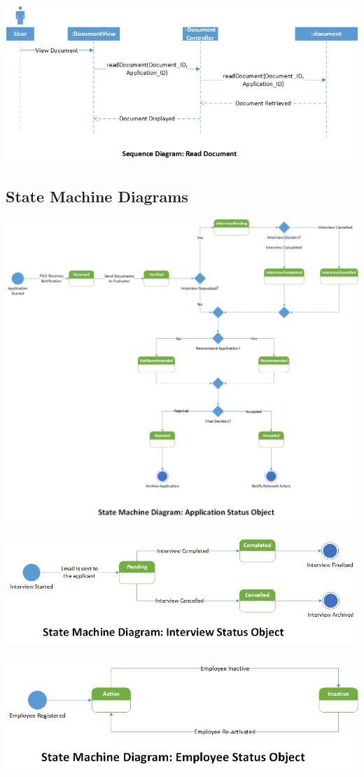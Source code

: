 \documentclass{article}
\begin{document}
\includegraphics[scale=0.7]{ReadDocumentSD.png} 
\subsection{State Machine Diagrams}
\includegraphics[scale=0.45]{ApplicationSMD.png} \\ \\
\includegraphics[scale=0.7]{InterviewSMD.png} \\ \\
\includegraphics[scale=0.75]{EmployeeSMD.png}
\end{document}
